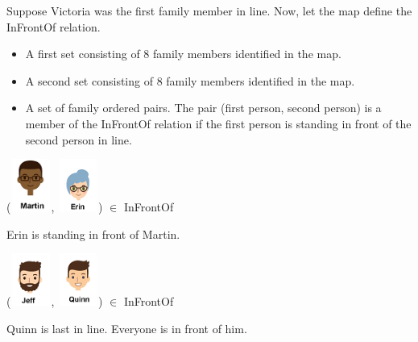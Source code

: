 \documentclass{ximera}
\begin{document}
\begin{exercise}

Suppose Victoria was the first family member in line. Now, let the map define the InFrontOf relation.

\begin{definition}
    \begin{itemize}
    \item A first set consisting of 8 family members identified in the map.
    \item A second set consisting of 8 family members identified in the map.
    \item A set of family ordered pairs. The pair (first person, second person) is a member of the InFrontOf relation if the first person is standing in front of the second person in line.
    \end{itemize}
\end{definition}


 ({\includegraphics[width=50px,height=65px]{pics/people/martin.png}}, {\includegraphics[width=50px,height=65px]{pics/people/erin.png}}) $\in$ InFrontOf 

  \begin{multipleChoice}
  \end{multipleChoice}
  \begin{feedback}
Erin is standing in front of Martin.
  \end{feedback}
\end{exercise}




\begin{exercise}

 ({\includegraphics[width=50px,height=65px]{pics/people/jeff.png}}, {\includegraphics[width=50px,height=65px]{pics/people/quinn.png}}) $\in$ InFrontOf 

  \begin{multipleChoice}
  \end{multipleChoice}
  \begin{feedback}
Quinn is last in line. Everyone is in front of him.
  \end{feedback}
\end{exercise}
\end{document}
